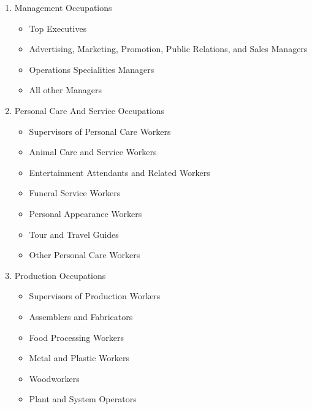 \documentclass{article}
\begin{document}
\begin{enumerate}
    \item  Management Occupations
        \begin{itemize}
            \item Top Executives
            \item Advertising, Marketing, Promotion, Public Relations, and Sales Managers
            \item Operations Specialities Managers
            \item All other Managers
        \end{itemize}
    \item  Personal Care And Service Occupations
        \begin{itemize}
            \item Supervisors of Personal Care Workers
            \item Animal Care and Service Workers
            \item Entertainment Attendants and Related Workers
            \item Funeral Service Workers
            \item Personal Appearance Workers
            \item Tour and Travel Guides
            \item Other Personal Care Workers
        \end{itemize}
    \item  Production Occupations
        \begin{itemize}
            \item Supervisors of Production Workers
            \item Assemblers and Fabricators
            \item Food Processing Workers
            \item Metal and Plastic Workers
            \item Woodworkers
            \item Plant and System Operators
        \end{itemize}
\end{enumerate}
\end{document}
